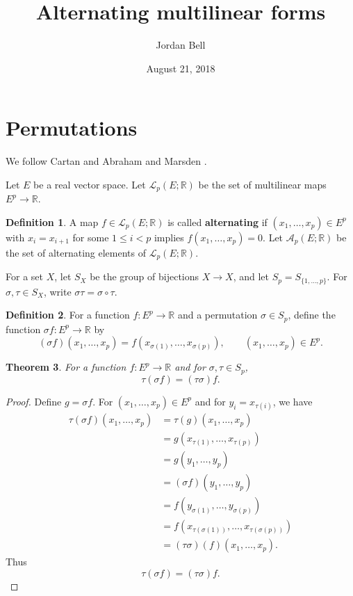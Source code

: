 \documentclass{article}
\newtheorem{theorem}{Theorem}
\theoremstyle{definition}
\newtheorem{definition}[theorem]{Definition}
\begin{document}
\title{Alternating multilinear forms}
\author{Jordan Bell}
\date{August 21, 2018}
\maketitle

\section{Permutations}
We follow Cartan \cite{cartan} and Abraham and Marsden \cite{abraham}.

Let $E$ be a real vector space.
Let $\mathscr{L}_p(E;\mathbb{R})$ be the set of multilinear maps $E^p \to \mathbb{R}$. 

\begin{definition}
A map $f \in \mathscr{L}_p(E;\mathbb{R})$ is called \textbf{alternating} if
$(x_1,\ldots,x_p) \in E^p$ with $x_i=x_{i+1}$ for some $1 \leq i < p$ implies $f(x_1,\ldots,x_p)=0$.
Let $\mathscr{A}_p(E;\mathbb{R})$ be the set of alternating elements of $\mathscr{L}_p(E;\mathbb{R})$.
\end{definition}

For a set $X$, let $S_X$ be the group of bijections $X \to X$, and let
$S_p=S_{\{1,\ldots,p\}}$.
For $\sigma,\tau \in S_X$, write $\sigma \tau = \sigma \circ \tau$.

\begin{definition}
For a function $f:E^p \to \mathbb{R}$ and a permutation $\sigma \in S_p$, define the function
$\sigma f:E^p \to \mathbb{R}$ by 
\[
(\sigma f)(x_1,\ldots,x_p) = f(x_{\sigma(1)},\ldots,x_{\sigma(p)}), \qquad (x_1,\ldots,x_p) \in E^p.
\]
\end{definition}

\begin{theorem}
For a function $f:E^p \to \mathbb{R}$ and for $\sigma,\tau \in S_p$,
\[
\tau(\sigma f) = (\tau \sigma) f.
\]
\label{action}
\end{theorem}
\begin{proof}
Define
 $g=\sigma f$. For $(x_1,\ldots,x_p) \in E^p$ and for 
$y_i = x_{\tau(i)}$, we have
\begin{align*}
\tau(\sigma f)(x_1,\ldots,x_p)&=\tau(g)(x_1,\ldots,x_p)\\
&=g(x_{\tau(1)},\ldots,x_{\tau(p)})\\
&=g(y_1,\ldots,y_p)\\
&=(\sigma f)(y_1,\ldots,y_p)\\
&=f(y_{\sigma(1)},\ldots,y_{\sigma(p)})\\
&=f(x_{\tau(\sigma(1))},\ldots,x_{\tau(\sigma(p))})\\
&=(\tau \sigma)(f)(x_1,\ldots,x_p).
\end{align*}
Thus
\[
\tau(\sigma f) = (\tau \sigma) f.
\]
\end{proof}
\end{document}
